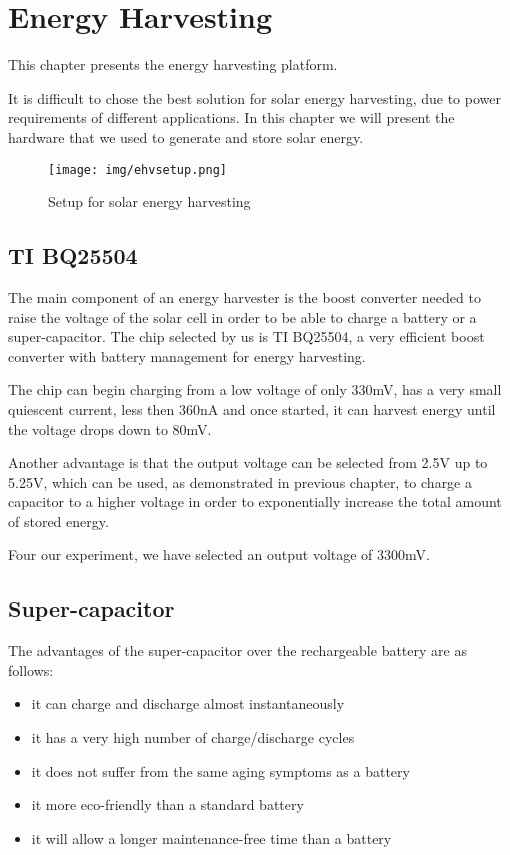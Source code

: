 \normalfont\normalsize
\chapter{Energy Harvesting}

This chapter presents the energy harvesting platform.

It is difficult to chose the best solution for solar energy harvesting, due to power requirements
of different applications. In this chapter we will present the hardware that we used to generate
and store solar energy.

\begin{figure}[ht] \centering
\texttt{[image: img/ehvsetup.png]}
\caption{Setup for solar energy harvesting}
\end{figure}

\section{TI BQ25504}
The main component of an energy harvester is the boost converter needed to raise the voltage of the
solar cell in order to be able to charge a battery or a super-capacitor. The chip selected by us is
TI BQ25504, a very efficient boost converter with battery management for energy harvesting.

The chip can begin charging from a low voltage of only 330mV, has a very small quiescent current,
less then 360nA and once started, it can harvest energy until the voltage drops down to 80mV.

Another advantage is that the output voltage can be selected from 2.5V up to 5.25V, which can be
used, as demonstrated in previous chapter, to charge a capacitor to a higher voltage in order
to exponentially increase the total amount of stored energy.

Four our experiment, we have selected an output voltage of 3300mV.

\section{Super-capacitor}
The advantages of the super-capacitor over the rechargeable battery are as follows:

\begin{itemize}
\item it can charge and discharge almost instantaneously
\item it has a very high number of charge/discharge cycles
\item it does not suffer from the same aging symptoms as a battery
\item it more eco-friendly than a standard battery
\item it will allow a longer maintenance-free time than a battery

\end{itemize}

